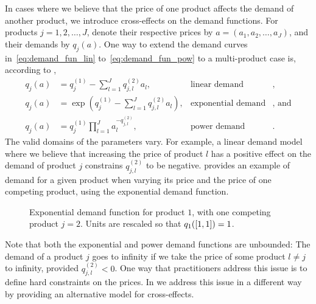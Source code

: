 \documentclass[main.tex]{subfiles}
\begin{document}
In cases where we believe that the price of one product affects the
demand of another product, we introduce cross-effects on the demand
functions. For products $j=1,2,\dots,J$, denote their respective prices by
$a=(a_1,a_2,\dots,a_J)$, and their demands by $q_j(a)$.
One way to extend the demand curves in~\eqref{eq:demand_fun_lin}
to~\eqref{eq:demand_fun_pow} to a multi-product case is, according to \citet{talluri2006theory},
\begin{align}
  q_j(a)&=q_{j}^{(1)}-\sum_{l=1}^Jq_{j,l}^{(2)}a_l,
  &\text{linear demand}&,\\
  q_j(a)&=\exp\left( q_{j}^{(1)}-\sum_{l=1}^Jq_{j,l}^{(2)}a_l
          \right),
  &\text{exponential demand}&\text{, and}\\
  q_j(a)&=q_j^{(1)}\prod_{l=1}^Ja_l^{-q_{j,l}^{(2)}},
  &\text{power demand}&.
\end{align}
The valid domains of the parameters vary. For example, a linear demand
model where we believe that increasing the price of product $l$ has a
positive effect on the demand of product $j$ constrains
$q_{j,l}^{(2)}$ to be negative. 
provides an example of demand for a given product when varying
its price and the price of one competing product, using the exponential demand function.
\begin{figure}[htbp]
  \centering
  \caption[Exponential demand function]{Exponential demand function for product $1$, with one
    competing product $j=2$.
    Units are rescaled so that $q_1(\left[1,1\right])=1$.
  }\label{fig:demand_exponential_two}
\end{figure}

\begin{remark}
  Note that both the exponential
  and power demand functions are unbounded: The demand of a product
  $j$ goes to infinity if we take the price of some product $l\neq j$
  to infinity, provided $q_{j,l}^{(2)}<0$. One way that practitioners
  address this issue is to define hard constraints on the prices.
  In  we address this issue in a different way by
  providing an alternative model for cross-effects.
\end{remark}
\end{document}
